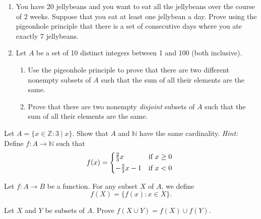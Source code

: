 \documentclass{article}
\newcommand{\Z}{\mathbb{Z}}
\newcommand{\N}{\mathbb{N}}
\theoremstyle{definition}
\begin{document}
\begin{question}{10}
    \begin{enumerate}
	\item You have 20 jellybeans and you want to eat all the jellybeans over the course of 2 weeks. Suppose that you eat at least one jellybean a day. Prove using the pigeonhole principle that there is a set of consecutive days where you ate exactly 7 jellybeans. 
	\item Let \(A\) be a set of 10 distinct integers between 1 and 100 (both inclusive). 
 \begin{enumerate}
     \item Use the pigeonhole principle to prove that there are two different nonempty subsets of \(A\) such that the sum of all their elements are the same.
     \item Prove that there are two nonempty \emph{disjoint} subsets of \(A\) such that the sum of all their elements are the same.
 \end{enumerate}
	
    \end{enumerate}
\end{question}
\begin{solution}
\end{solution}


\begin{question}{10}
    Let \(A = \{ x \in \Z : 3\mid x \}\).  Show that \(A\) and \(\mathbb{N}\) have the same cardinality.  \textit{Hint:} Define \(f\colon A \rightarrow \N\) such that
    \[
        f(x) = \begin{cases*}
                    \frac{2}{3}x & if \(x \geq 0\)\\
                    -\frac{2}{3}x-1 & if \( x < 0 \)
               \end{cases*}
    \]
\end{question}
\begin{solution}
\end{solution}

\begin{question}{6}
Let \(f\colon A\to B\) be a function.
For any subset \(X\) of \(A\), we define \[ f(X) = \{ f(x) : x \in X \}.\]

Let \(X\) and \(Y\) be subsets of \(A\). Prove \(f(X\cup Y) = f(X) \cup f(Y)\).
\end{question}
\begin{solution}
\end{solution}
\end{document}
